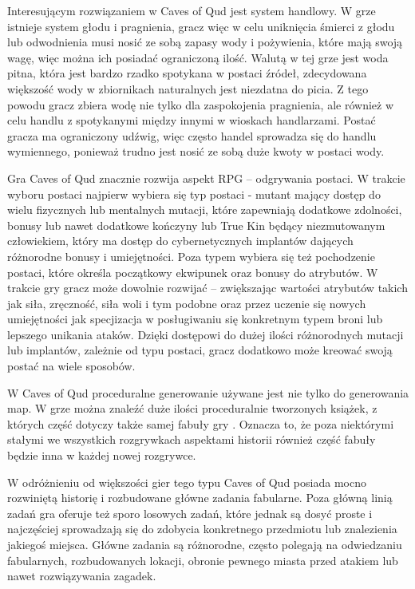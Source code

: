 \documentclass[12pt,twoside]{article}
\begin{document}
Interesującym rozwiązaniem w Caves of Qud jest system handlowy. W grze istnieje system głodu i pragnienia, gracz więc w celu uniknięcia śmierci z głodu lub odwodnienia musi nosić ze sobą zapasy wody i pożywienia, które mają swoją wagę, więc można ich posiadać ograniczoną ilość. Walutą w tej grze jest woda pitna, która jest bardzo rzadko spotykana w postaci źródeł, zdecydowana większość wody w zbiornikach naturalnych jest niezdatna do picia. Z tego powodu gracz zbiera wodę nie tylko dla zaspokojenia pragnienia, ale również w celu handlu z spotykanymi między innymi w wioskach handlarzami. Postać gracza ma ograniczony udźwig, więc często handel sprowadza się do handlu wymiennego, ponieważ trudno jest nosić ze sobą duże kwoty w postaci wody.

Gra Caves of Qud znacznie rozwija aspekt RPG -- odgrywania postaci. W trakcie wyboru postaci najpierw wybiera się typ postaci - mutant mający dostęp do wielu fizycznych lub mentalnych mutacji, które zapewniają dodatkowe zdolności, bonusy lub nawet dodatkowe kończyny lub True Kin będący niezmutowanym człowiekiem, który ma dostęp do cybernetycznych implantów dających różnorodne bonusy i umiejętności. Poza typem wybiera się też pochodzenie postaci, które określa początkowy ekwipunek oraz bonusy do atrybutów. W trakcie gry gracz może dowolnie rozwijać -- zwiększając wartości atrybutów takich jak siła, zręczność, siła woli i tym podobne oraz przez uczenie się nowych umiejętności jak specjizacja w posługiwaniu się konkretnym typem broni lub lepszego unikania ataków. Dzięki dostępowi do dużej ilości różnorodnych mutacji lub implantów, zależnie od typu postaci, gracz dodatkowo może kreować swoją postać na wiele sposobów.

W Caves of Qud proceduralne generowanie używane jest nie tylko do generowania map. W grze można znaleźć duże ilości proceduralnie tworzonych książek, z których część dotyczy także samej fabuły gry \cite{coq_history}. Oznacza to, że poza niektórymi stałymi we wszystkich rozgrywkach aspektami historii również część fabuły będzie inna w każdej nowej rozgrywce.

W odróżnieniu od większości gier tego typu Caves of Qud posiada mocno rozwiniętą historię i rozbudowane główne zadania fabularne. Poza główną linią zadań gra oferuje też sporo losowych zadań, które jednak są dosyć proste i najczęściej sprowadzają się do zdobycia konkretnego przedmiotu lub znalezienia jakiegoś miejsca. Główne zadania są różnorodne, często polegają na odwiedzaniu fabularnych, rozbudowanych lokacji, obronie pewnego miasta przed atakiem lub nawet rozwiązywania zagadek.
\end{document}
